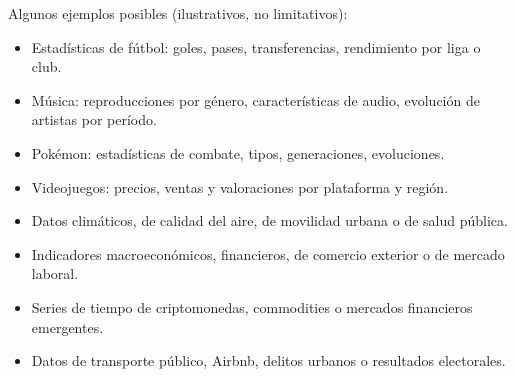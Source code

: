 \documentclass[11pt,a4paper]{article}
\begin{document}
Algunos ejemplos posibles (ilustrativos, no limitativos):
\begin{itemize}[itemsep=1pt]
  \item Estadísticas de fútbol: goles, pases, transferencias, rendimiento por liga o club.
  \item Música: reproducciones por género, características de audio, evolución de artistas por período.
  \item Pokémon: estadísticas de combate, tipos, generaciones, evoluciones.
  \item Videojuegos: precios, ventas y valoraciones por plataforma y región.
  \item Datos climáticos, de calidad del aire, de movilidad urbana o de salud pública.
  \item Indicadores macroeconómicos, financieros, de comercio exterior o de mercado laboral.
  \item Series de tiempo de criptomonedas, commodities o mercados financieros emergentes.
  \item Datos de transporte público, Airbnb, delitos urbanos o resultados electorales.
\end{itemize}
\end{document}
